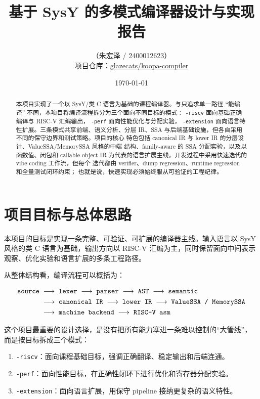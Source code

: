 \documentclass[UTF8,a4paper,11pt]{ctexart}
\title{基于 SysY 的多模式编译器设计与实现报告}
\author{（朱宏泽 / 2400012623）\\
\small 项目仓库：\href{https://github.com/glazecats/koopa-compiler}{glazecats/koopa-compiler}}
\date{\today}
\newcommand{\stage}[1]{\text{\texttt{#1}}}
\newcommand{\nextstage}{\;\longrightarrow\;}
\begin{document}
\tableofcontents
\clearpage
{}

\maketitle

\begin{abstract}
本项目实现了一个以 SysY/类 C 语言为基础的课程编译器。与只追求单一路径
``能编译'' 不同，本项目将编译流程拆分为三个面向不同目标的模式：
\texttt{-riscv} 面向基础正确编译与 RISC-V 汇编输出，
\texttt{-perf} 面向性能优化与分配实验，
\texttt{-extension} 面向语言特性扩展。三条模式共享前端、语义分析、分层
IR、SSA 与后端基础设施，但各自采用不同的保守边界和测试策略。项目的核心
特色包括 canonical IR 与 lower IR 的分层设计、ValueSSA/MemorySSA 风格的中端
结构、family-aware 的 SSA 分配实验，以及以函数值、闭包和 callable-object IR
为代表的语言扩展主线。开发过程中采用快速迭代的 vibe coding 工作流，但每个
迭代都由 verifier、dump regression、runtime regression 和全量测试闭环约束；
也就是说，快速实现必须始终服从可验证的工程纪律。
\end{abstract}

\section{项目目标与总体思路}

本项目的目标是实现一条完整、可验证、可扩展的编译器主线。输入语言以 SysY
风格的类 C 语言为基础，输出方向以 RISC-V 汇编为主，同时保留面向中间表示
观察、优化实验和语言扩展的多条工程路径。

从整体结构看，编译流程可以概括为：

\[
\begin{aligned}
\stage{source}
&\nextstage \stage{lexer}
\nextstage \stage{parser}
\nextstage \stage{AST}
\nextstage \stage{semantic} \\
&\nextstage \stage{canonical IR}
\nextstage \stage{lower IR}
\nextstage \stage{ValueSSA / MemorySSA} \\
&\nextstage \stage{machine backend}
\nextstage \stage{RISC-V asm}
\end{aligned}
\]

这个项目最重要的设计选择，是没有把所有能力塞进一条难以控制的“大管线”，
而是按目标拆成三个模式：

\begin{enumerate}[label=\arabic*.]
  \item \texttt{-riscv}：面向课程基础目标，强调正确翻译、稳定输出和后端连通。
  \item \texttt{-perf}：面向性能目标，在正确性闭环下进行优化和寄存器分配实验。
  \item \texttt{-extension}：面向语言扩展，用保守 pipeline 接纳更复杂的语义特性。
\end{enumerate}
\end{document}
